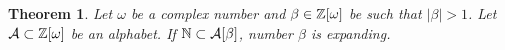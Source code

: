 \documentclass{article}
\newtheorem{theo}{Theorem}
\newtheorem{lem}[theo]{Lemma}
\begin{document}




\begin{theo}
\label{thm:betaExpanding}
    Let $\omega$ be a complex number and $\beta \in\mathbb{Z}[\omega]$ be such that $|\beta|>1$. Let $\mathcal{A}\subset \mathbb{Z}[\omega]$ be an alphabet. If $\mathbb{N}\subset \mathcal{A}[\beta]$, number $\beta$ is expanding.
\end{theo}
\end{document}
